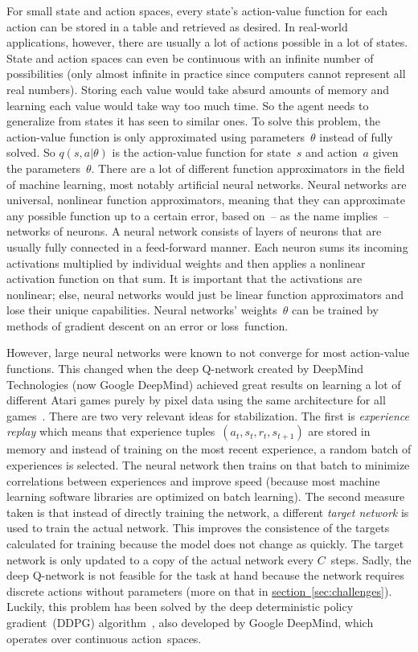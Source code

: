 \documentclass[a4paper,titlepage]{article}
\begin{document}
For small state and action spaces, every state's action-value function for each action can be stored in a table and retrieved as desired. In real-world applications, however, there are usually a lot of actions possible in a lot of states. State and action spaces can even be continuous with an infinite number of possibilities (only almost infinite in practice since computers cannot represent all real numbers). Storing each value would take absurd amounts of memory and learning each value would take way too much time. So the agent needs to generalize from states it has seen to similar ones. To solve this problem, the action-value function is only approximated using parameters~$\theta$ instead of fully solved. So $q(s, a | \theta)$ is the action-value function for state~$s$ and action~$a$ given the parameters~$\theta$. There are a lot of different function approximators in the field of machine learning, most notably artificial neural networks. Neural networks are universal, nonlinear   function approximators, meaning that they can approximate any possible function up to a certain error, based on~-- as the name implies~-- networks of neurons. A neural network consists of layers of neurons that are usually fully connected in a feed-forward manner. Each neuron sums its incoming activations multiplied by individual weights and then applies a nonlinear activation function on that sum. %
It is important that the activations are nonlinear; else, neural networks would just be linear function approximators and lose their unique capabilities.
Neural networks' weights~$\theta$ can be trained by methods of gradient descent on an error or loss~function. %

However, large neural networks were known to not converge for most action-value functions. This changed when the deep Q-network created by DeepMind Technologies (now Google DeepMind) achieved great results on learning a lot of different Atari games purely by pixel data using the same architecture for all games~\cite{nature}. There are two very relevant ideas for stabilization. The first is \emph{experience replay} which means that experience tuples~$(a_t, s_t, r_t, s_{t+1})$ are stored in memory and instead of training on the most recent experience, a random batch of experiences is selected. The neural network then trains on that batch to minimize correlations between experiences and improve speed (because most machine learning software libraries are optimized on batch learning). The second measure taken is that instead of directly training the network, a different \emph{target network} is used to train the actual network. This improves the consistence of the targets calculated for training because the model does not change as quickly. The target network is only updated to a copy of the actual network every $C$~steps. Sadly, the deep Q-network is not feasible for the task at hand because the network requires discrete actions without parameters (more on that in \hyperref[sec:challenges]{section~\ref*{sec:challenges}}). Luckily, this problem has been solved by the deep deterministic policy gradient~(DDPG) algorithm~\cite{ddpg}, also developed by Google DeepMind, which operates over continuous action~spaces.
\end{document}
